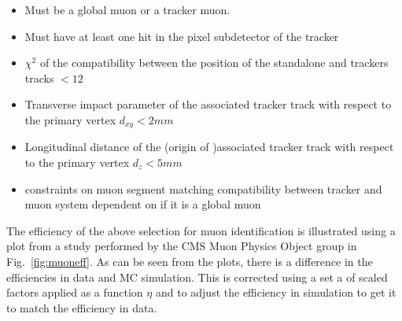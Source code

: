 \begin{itemize}
\item Must be a global muon or a tracker muon.
\item Must have at least one hit in the pixel subdetector of the tracker
\item $\chi^2$ of the compatibility between the position of the standalone and trackers tracks $<12$
\item Transverse impact parameter of the associated tracker track with respect to the primary vertex $d_{xy}< 2 mm$
\item Longitudinal distance of the (origin of )associated tracker track with respect to the primary vertex $d_z <5 mm$
\item constraints on muon segment matching compatibility between tracker and muon system dependent on if it is a global muon
\end{itemize}
The efficiency of the above selection for muon identification is illustrated using a plot from a study performed by the CMS Muon Physics Object group in Fig.~\ref{fig:muoneff}. As can be seen from the plots, there is a difference in the efficiencies in data and MC simulation. This is corrected using a set a of scaled factors applied as a function $\eta$ and \pt to adjust the efficiency in simulation to get it to match the efficiency in data.  


